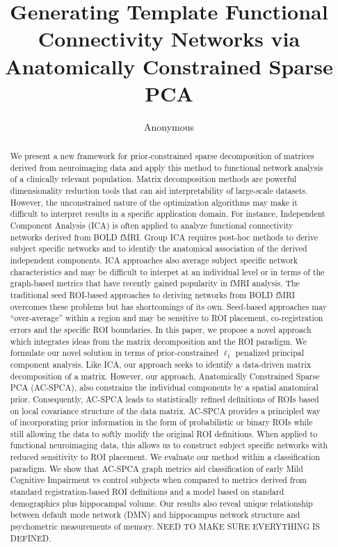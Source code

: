 \documentclass{llncs}
\begin{document}
\vspace{-0.1in}
\title{Generating Template Functional Connectivity Networks via Anatomically Constrained Sparse PCA}
\author{Anonymous}
\maketitle              
\begin{abstract}
We present a new framework for prior-constrained sparse decomposition of matrices derived from neuroimaging data and apply this method to functional network analysis of a clinically relevant population. Matrix decomposition methods are powerful dimensionality reduction tools that can aid interpretability of large-scale datasets.  However, the unconstrained nature of the optimization algorithms may make it difficult to interpret results in a specific application domain.  For instance, Independent Component Analysis (ICA) is often applied to analyze functional connectivity networks derived from BOLD fMRI.  Group ICA requires post-hoc methods to derive subject specific networks and to identify the anatomical association of the derived independent components.  ICA approaches also average subject specific network characteristics and may be difficult to interpet at an individual level or in terms of the graph-based metrics that have recently gained popularity in fMRI analysis.  The traditional seed ROI-based approaches to deriving networks from BOLD fMRI overcomes these problems but has shortcomings of its own.  Seed-based approaches may ``over-average'' within a region and may be sensitive to ROI placement, co-registration errors and the specific ROI boundaries. In this paper, we propose a novel approach which integrates ideas from the matrix decomposition and the ROI paradigm.  We formulate our novel solution in terms of prior-constrained $\ell_1$ penalized principal component analysis. Like ICA, our approach seeks to identify a data-driven matrix decomposition of a matrix.  However, our approach,  Anatomically Constrained Sparse PCA (AC-SPCA), also constrains the individual components by a spatial anatomical prior. Consequently, AC-SPCA leads to statistically refined definitions of ROIs based on local covariance structure of the data matrix. AC-SPCA provides a principled way of incorporating prior information in the form of probabilistic or binary ROIs while still allowing the data to softly modify the original ROI definitions. When applied to functional neuroimaging data, this allows us to construct subject specific networks with reduced sensitivity to ROI placement.  We evaluate our method within a classification paradigm.  We show that AC-SPCA graph metrics aid classification of early Mild Cognitive Impairment vs control subjects when compared to metrics derived from standard registration-based ROI definitions and a model based on standard demographics plus hippocampal volume.  Our results also reveal unique relationship between default mode network (DMN) and hippocampus network structure and psychometric measurements of memory.  NEED TO MAKE SURE EVERYTHING IS DEFINED.
\end{abstract}
\end{document}
